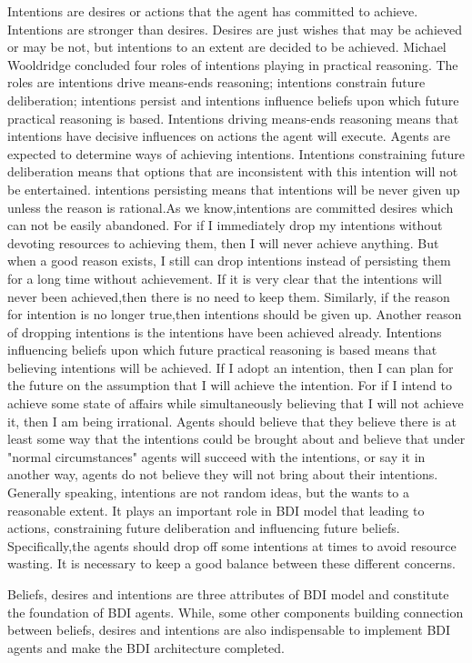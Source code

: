 Intentions are desires or actions that the agent has committed to achieve\cite{Alejandro_LearnBDI_2004}. Intentions are stronger than desires. Desires are just wishes that may be achieved or may be not, but intentions to an extent are decided to be achieved. Michael Wooldridge concluded four roles of intentions playing in practical reasoning. The roles are intentions drive means-ends reasoning; intentions constrain future deliberation; intentions persist and intentions influence beliefs upon which future practical reasoning is based\cite{Gerhard_MultiSystem_1999}. Intentions driving means-ends reasoning means that intentions have decisive influences on actions the agent will execute. Agents are expected to determine ways of achieving intentions. Intentions constraining future deliberation means that options that are inconsistent with this intention will not be entertained. intentions persisting means that intentions will be never given up unless the reason is rational.As we know,intentions are committed desires which can not be easily abandoned. For if I immediately drop my intentions without devoting resources to achieving them, then I will never achieve anything\cite{Gerhard_MultiSystem_1999}. But when a good reason exists, I still can drop intentions instead of persisting them for a long time without achievement. If it is very clear that the intentions will never been achieved,then there is no need to keep them. Similarly, if the reason for intention is no longer true,then intentions should be given up. Another reason of dropping intentions is the intentions have been achieved already. Intentions influencing beliefs upon which future practical reasoning is based means that believing intentions will be achieved. If I adopt an intention, then I can plan for the future on the assumption that I will achieve the intention. For if I intend to achieve some state of affairs while simultaneously believing that I will not achieve it, then I am being irrational\cite{Gerhard_MultiSystem_1999}. Agents should believe that they believe there is at least some way that the intentions could be brought about and believe that under "normal circumstances" agents will succeed with the intentions, or say it in another way, agents do not believe they will not bring about their intentions. Generally speaking, intentions are not random ideas, but the wants to a reasonable extent. It plays an important role in BDI model that leading to actions, constraining future deliberation and influencing future beliefs. Specifically,the agents should drop off some intentions at times to avoid resource wasting. It is necessary to keep a good balance between these different concerns.

Beliefs, desires and intentions are three attributes of BDI model and constitute the foundation of BDI agents. While, some other components building connection between beliefs, desires and intentions are also indispensable to implement BDI agents and make the BDI architecture completed.


